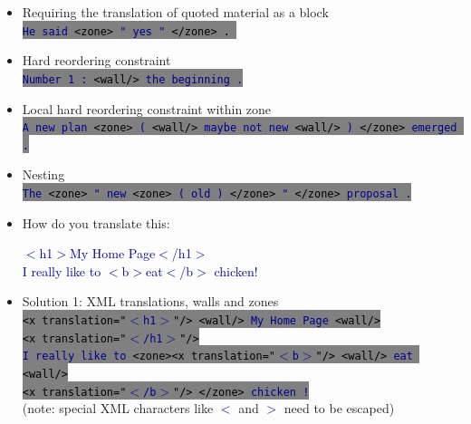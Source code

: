 \documentclass[landscape]{uedslides2C}
\newcommand{\example}[1]{\textcolor{darkblue}{\rm #1}}
\newcommand{\littlecode}[1]{\colorbox{gray}{\textcolor{black}{\small \tt #1}}}
\begin{document}

\vspace{10mm}
\begin{itemize}
\item Requiring the translation of quoted material as a block\\
\littlecode{\example{He said} <zone> \example{" yes "} </zone> . }
\item Hard reordering constraint\\
\littlecode{\example{Number 1 : }<wall/> \example{the beginning .}}
\item Local hard reordering constraint within zone\\
\littlecode{\example{A new plan} <zone> \example{(} <wall/> \example{maybe not new} <wall/> \example{)} </zone> \example{emerged .}}
\item Nesting\\
\littlecode{\example{The} <zone> \example{" new} <zone> \example{( old )} </zone> \example{"} </zone> \example{proposal .}}
\end{itemize}


\begin{itemize}
\item How do you translate this:
\begin{center}
\example{$<$h1$>$My Home Page$<$/h1$>$\\
I really like to $<$b$>$eat$<$/b$>$ chicken!}
\end{center}
\item Solution 1: XML translations, walls and zones\\[5mm]
\littlecode{<x translation="\example{$<$h1$>$}"/> <wall/> \example{My Home Page} <wall/>}\\[-2mm]
\littlecode{<x translation="\example{$<$/h1$>$}"/>}\\[2mm]
\littlecode{\example{I really like to} <zone><x translation="\example{$<$b$>$}"/> <wall/> \example{eat} <wall/>}\\[-2mm]
\littlecode{<x translation="\example{$<$/b$>$}"/> </zone> \example{chicken !}}\\[5mm]
(note: special XML characters like \example{$<$} and \example{$>$} need to be escaped)
\end{itemize}

\end{document}
